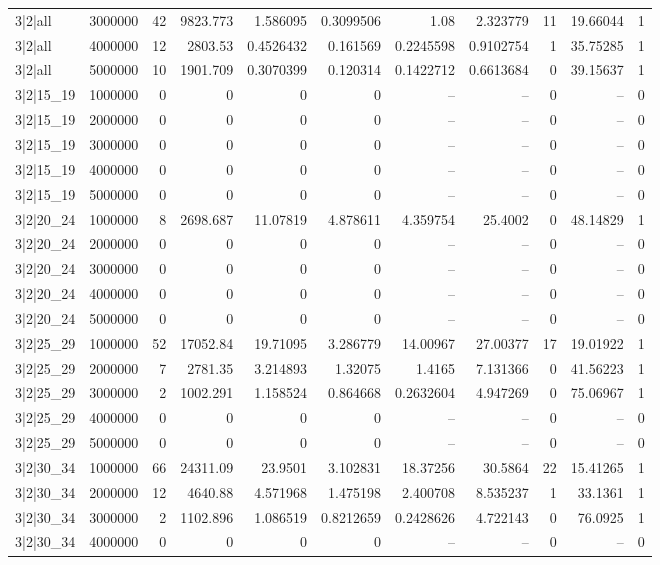 \begin{tabular}{lrrrrrrrrrr}
3|2|all & 3000000 & 42 & 9823.773 & 1.586095 & 0.3099506 & 1.08 & 2.323779 & 11 & 19.66044 & 1 \\
3|2|all & 4000000 & 12 & 2803.53 & 0.4526432 & 0.161569 & 0.2245598 & 0.9102754 & 1 & 35.75285 & 1 \\
3|2|all & 5000000 & 10 & 1901.709 & 0.3070399 & 0.120314 & 0.1422712 & 0.6613684 & 0 & 39.15637 & 1 \\
3|2|15\_19 & 1000000 & 0 & 0 & 0 & 0 & -- & -- & 0 & -- & 0 \\
3|2|15\_19 & 2000000 & 0 & 0 & 0 & 0 & -- & -- & 0 & -- & 0 \\
3|2|15\_19 & 3000000 & 0 & 0 & 0 & 0 & -- & -- & 0 & -- & 0 \\
3|2|15\_19 & 4000000 & 0 & 0 & 0 & 0 & -- & -- & 0 & -- & 0 \\
3|2|15\_19 & 5000000 & 0 & 0 & 0 & 0 & -- & -- & 0 & -- & 0 \\
3|2|20\_24 & 1000000 & 8 & 2698.687 & 11.07819 & 4.878611 & 4.359754 & 25.4002 & 0 & 48.14829 & 1 \\
3|2|20\_24 & 2000000 & 0 & 0 & 0 & 0 & -- & -- & 0 & -- & 0 \\
3|2|20\_24 & 3000000 & 0 & 0 & 0 & 0 & -- & -- & 0 & -- & 0 \\
3|2|20\_24 & 4000000 & 0 & 0 & 0 & 0 & -- & -- & 0 & -- & 0 \\
3|2|20\_24 & 5000000 & 0 & 0 & 0 & 0 & -- & -- & 0 & -- & 0 \\
3|2|25\_29 & 1000000 & 52 & 17052.84 & 19.71095 & 3.286779 & 14.00967 & 27.00377 & 17 & 19.01922 & 1 \\
3|2|25\_29 & 2000000 & 7 & 2781.35 & 3.214893 & 1.32075 & 1.4165 & 7.131366 & 0 & 41.56223 & 1 \\
3|2|25\_29 & 3000000 & 2 & 1002.291 & 1.158524 & 0.864668 & 0.2632604 & 4.947269 & 0 & 75.06967 & 1 \\
3|2|25\_29 & 4000000 & 0 & 0 & 0 & 0 & -- & -- & 0 & -- & 0 \\
3|2|25\_29 & 5000000 & 0 & 0 & 0 & 0 & -- & -- & 0 & -- & 0 \\
3|2|30\_34 & 1000000 & 66 & 24311.09 & 23.9501 & 3.102831 & 18.37256 & 30.5864 & 22 & 15.41265 & 1 \\
3|2|30\_34 & 2000000 & 12 & 4640.88 & 4.571968 & 1.475198 & 2.400708 & 8.535237 & 1 & 33.1361 & 1 \\
3|2|30\_34 & 3000000 & 2 & 1102.896 & 1.086519 & 0.8212659 & 0.2428626 & 4.722143 & 0 & 76.0925 & 1 \\
3|2|30\_34 & 4000000 & 0 & 0 & 0 & 0 & -- & -- & 0 & -- & 0 \\

\end{tabular}
